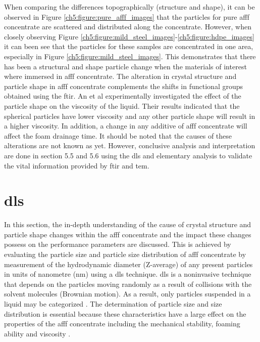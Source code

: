 When comparing the differences topographically (structure and shape), it can be observed in Figure \ref{ch5:figure:pure_afff_images} that the particles for pure \acrshort{afff} concentrate are scattered and distributed along the concentrate. However, when closely observing Figure \ref{ch5:figure:mild_steel_images}-\ref{ch5:figure:hdpe_images} it can been see that the particles for these samples are concentrated in one area, especially in Figure \ref{ch5:figure:mild_steel_images}. This demonstrates that there has been a structural and shape particle change when the materials of interest where immersed in \acrshort{afff} concentrate. The alteration in crystal structure and particle shape in \acrshort{afff} concentrate complements the shifts in functional groups obtained using the \acrshort{ftir}. An et al \cite{lin1991handbook} experimentally investigated the effect of the particle shape on the viscosity of the liquid. Their results indicated that the spherical particles have lower viscosity and any other particle shape will result in a higher viscosity. In addition, a change in any additive of \acrshort{afff} concentrate will affect the foam drainage time. It should be noted that the causes of these alterations are not known as yet. However, conclusive analysis and interpretation are done in section 5.5 and 5.6 using the \acrshort{dls} and elementary analysis to validate the vital information provided by \acrshort{ftir} and \acrshort{tem}.

\section{\Acrfull{dls}}
In this section, the in-depth understanding of the cause of crystal structure and particle shape changes within the \acrshort{afff} concentrate and the impact these changes possess on the performance parameters are discussed. This is achieved by evaluating the particle size and particle size distribution of \acrshort{afff} concentrate by measurement of the hydrodynamic diameter (Z-average) of any present particles in units of nanometre (nm) using a \acrshort{dls} technique. \acrshort{dls} is a noninvasive technique that depends on the particles moving randomly as a result of collisions with the solvent molecules (Brownian motion). As a result, only particles suspended in a liquid may be categorized \cite{mudunkotuwa2014atr}. The determination of particle size and size distribution is essential because these characteristics have a large effect on the properties of the \acrshort{afff} concentrate including the mechanical stability, foaming ability and viscosity \cite{mohamed2017fourier}.

